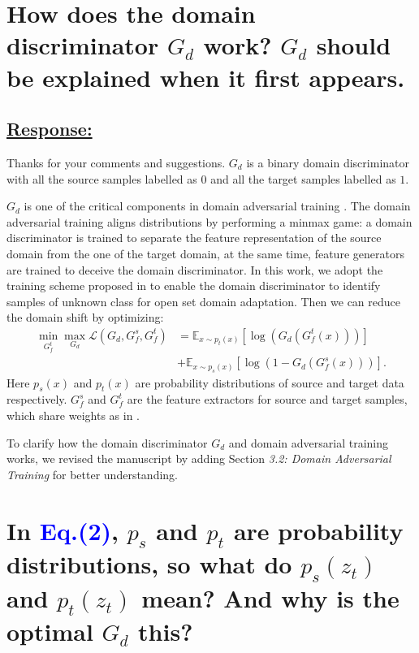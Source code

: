 \section{How does the domain discriminator $G_d$ work? $G_d$ should be explained when it first appears.}

\subsection*{\underline{\textbf{Response:}}}

Thanks for your comments and suggestions.
$G_d$ is a binary domain discriminator with all the source samples labelled as $0$ and all the target samples labelled as $1$.

$G_d$ is one of the critical components in domain adversarial training \cite{DomainAdversrialNetwork,ADDA,OpensetDA-bp}.
The domain adversarial training aligns distributions by performing a minmax game: a domain discriminator is trained to separate the feature representation of the source domain from the one of the target domain, at the same time, feature generators are trained to deceive the domain discriminator.
In this work, we adopt the training scheme proposed in \cite{OpensetDA-bp} to enable the domain discriminator to identify samples of unknown class for open set domain adaptation.
Then we can reduce the domain shift by optimizing:
\begin{equation}
    \label{eq: training DANN}
    \begin{split}
        \min_{G_f^t} \max_{G_d} \mathscr{L}(G_d,G^{s}_{f},G_f^t) &=\mathbb{E}_{x\sim p_t(x)} \left[ \log \left(G_d\left(G_f^t\left(x\right)\right)\right) \right]\\
        &+\mathbb{E}_{x\sim p_s(x)}\left[ \log \left(1-G_d\left(G_f^s\left(x\right)\right)\right) \right].
    \end{split}
\end{equation}
Here $p_s (x)$ and $p_t (x)$ are probability distributions of source and target data respectively.
$G_f^s$ and $G_f^t$ are the feature extractors for source and target samples, which share weights as in \cite{OpensetDA-bp}.

To clarify how the domain discriminator $G_d$ and domain adversarial training works, we revised the manuscript by adding Section \textit{3.2: Domain Adversarial Training} for better understanding.


\section{In \textcolor{blue}{Eq.(2)}, $p_s$ and $p_t$ are probability distributions, so what do $p_s (z_t)$ and $p_t (z_t)$ mean? And why is the optimal $G_d$ this? }
